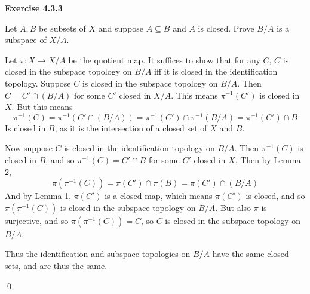 \documentclass[12pt]{article}
\newcommand{\qcolor}{Gray}
\newcommand{\acolor}{Black}
\newcommand{\question}[1]{
	\color{\qcolor} 
	\item[#1~]}
\newcommand{\answer}[0]{
	\color{\acolor} 
	\item[]}
\newenvironment{exercise}[1]
{
	{
		\Large
		\color{\acolor}
		\addtolength\leftskip{-2em}
		\textbf{Exercise #1}
		
	}
	\begin{list}{}
	{
		\setlength\leftmargin{1em}
		\setlength\rightmargin{0em}
		\setlength\labelwidth{2em}
		\setlength\itemsep{0em}
		\setlength\parsep{0.5em}
		\setlength\baselineskip{1.25em}
	}
}
{
  \qed{}
  \end{list}
}
\begin{document}
\begin{exercise}{4.3.3}
  \question{} Let $A, B$ be subsets of $X$ and suppose $A \subseteq B$ and $A$ is closed. Prove $B/A$ is a subspace of $X/A$.
  \answer
  Let $\pi : X \to X/A$ be the quotient map. It suffices to show that for any $C$, $C$ is closed in the subspace topology on $B/A$ iff it is closed in the identification topology. Suppose $C$ is closed in the subspace topology on $B/A$. Then $C = C' \cap (B/A)$ for some $C'$ closed in $X/A$. This means $\pi^{-1}(C')$ is closed in $X$. But this means
  $$\pi^{-1}(C) = \pi^{-1}(C' \cap (B/A)) = \pi^{-1}(C') \cap \pi^{-1}(B/A) = \pi^{-1}(C') \cap B$$
  Is closed in $B$, as it is the intersection of a closed set of $X$ and $B$.

  Now suppose $C$ is closed in the identification topology on $B/A$. Then $\pi^{-1}(C)$ is closed in $B$, and so $\pi^{-1}(C) = C' \cap B$ for some $C'$ closed in $X$. Then by Lemma 2,
  $$\pi(\pi^{-1}(C)) = \pi(C') \cap \pi(B) = \pi(C') \cap (B/A)$$
  And by Lemma 1, $\pi(C')$ is a closed map, which means $\pi(C')$ is closed, and so $\pi(\pi^{-1}(C))$ is closed in the subspace topology on $B/A$. But also $\pi$ is surjective, and so $\pi(\pi^{-1}(C)) = C$, so $C$ is closed in the subspace topology on $B/A$.

  Thus the identification and subspace topologies on $B/A$ have the same closed sets, and are thus the same.
\end{exercise}
\end{document}
